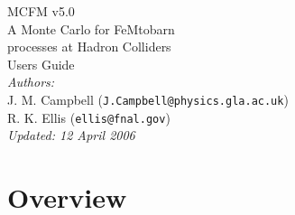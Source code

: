 \documentclass[12pt]{article}
\begin{document}
\def\GeV{\mbox{GeV}}

\thispagestyle{empty}
\vspace*{3cm}
\begin{center}
{\Huge MCFM v5.0} \\
\vspace*{0.5cm}
\Large{A Monte Carlo for FeMtobarn} \\
\Large{processes at Hadron Colliders} \\
\vspace*{2cm}
{\huge Users Guide} \\
\vspace*{4cm}
{\it Authors:} \\
\vspace*{0.2cm}
J. M. Campbell ({\tt J.Campbell@physics.gla.ac.uk}) \\
R. K. Ellis ({\tt ellis@fnal.gov}) \\
\vspace*{2.5cm}
{\it \small Updated: 12 April 2006}
\end{center}

\newpage

\tableofcontents

\section{Overview}
\end{document}
